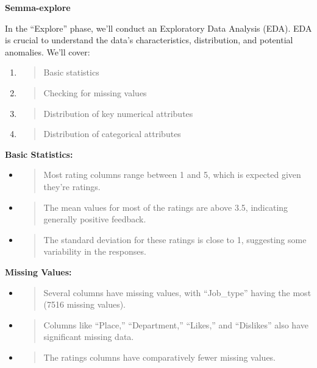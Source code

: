 \documentclass[
]{article}
\newcommand{\textcenter}[1]{\begin{center} \vspace{10px}\textbf{\large #1} \end{center}}
\begin{document}
\textcenter{Semma-explore}

In the ``Explore'' phase, we'll conduct an Exploratory Data Analysis
(EDA). EDA is crucial to understand the data's characteristics,
distribution, and potential anomalies. We'll cover:

\begin{enumerate}
\def\labelenumi{\arabic{enumi}.}
\item
  \begin{quote}
  Basic statistics
  \end{quote}
\item
  \begin{quote}
  Checking for missing values
  \end{quote}
\item
  \begin{quote}
  Distribution of key numerical attributes
  \end{quote}
\item
  \begin{quote}
  Distribution of categorical attributes
  \end{quote}
\end{enumerate}

\textbf{Basic Statistics:}

\begin{itemize}
\item
  \begin{quote}
  Most rating columns range between 1 and 5, which is expected given
  they're ratings.
  \end{quote}
\item
  \begin{quote}
  The mean values for most of the ratings are above 3.5, indicating
  generally positive feedback.
  \end{quote}
\item
  \begin{quote}
  The standard deviation for these ratings is close to 1, suggesting
  some variability in the responses.
  \end{quote}
\end{itemize}

\textbf{Missing Values:}

\begin{itemize}
\item
  \begin{quote}
  Several columns have missing values, with ``Job\_type'' having the
  most (7516 missing values).
  \end{quote}
\item
  \begin{quote}
  Columns like ``Place,'' ``Department,'' ``Likes,'' and ``Dislikes''
  also have significant missing data.
  \end{quote}
\item
  \begin{quote}
  The ratings columns have comparatively fewer missing values.
  \end{quote}
\end{itemize}
\end{document}
